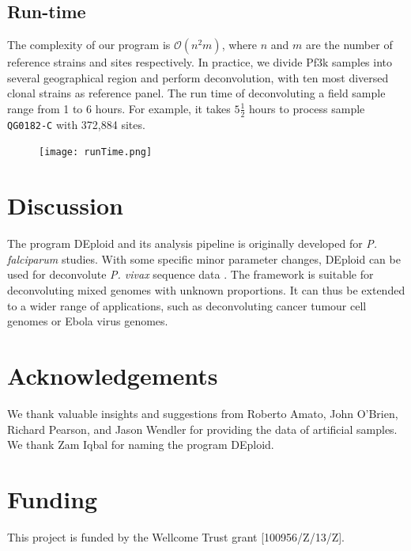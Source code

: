 \documentclass{bioinfo}
\begin{document}
\begin{methods}
\begin{figure}[ht]
\begin{center}
\end{center}
\end{figure}

\subsection{Run-time}
The complexity of our program is $\mathcal{O}(n^2m)$, where $n$ and $m$ are the number of reference strains and sites respectively. In practice, we divide Pf3k samples into several geographical region and perform deconvolution, with ten most diversed clonal strains as reference panel. The run time of deconvoluting a field sample range from 1 to 6 hours. For example, it takes $5\frac{1}{2}$ hours to process sample {\tt QG0182-C} with 372,884 sites.


\begin{figure}[ht]
\centering
\texttt{[image: runTime.png]}
\end{figure}

\end{methods}


\section{Discussion}
The program DEploid and its analysis pipeline is originally developed for {\it P. falciparum} studies. With some specific minor parameter changes, DEploid can be used for deconvolute {\it P. vivax} sequence data \citep{Pearson2016}. The framework is suitable for deconvoluting mixed genomes with unknown proportions. It can thus be extended to a wider range of applications, such as deconvoluting cancer tumour cell genomes or Ebola virus genomes.



\section*{Acknowledgements}
We thank valuable insights and suggestions from Roberto Amato, John O'Brien, Richard Pearson, and Jason Wendler for providing the data of artificial samples. We thank Zam Iqbal for naming the program DEploid.

\section*{Funding}
This project is funded by the Wellcome Trust grant [100956/Z/13/Z].\\
~\\
\end{document}
